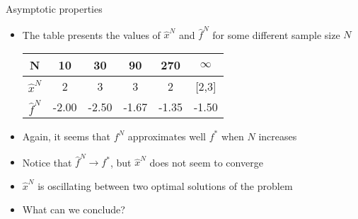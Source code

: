 \begin{frame}{Asymptotic properties}

\begin{itemize}

\item The table presents the values of $\hat x^N$ and $\hat f^N$ for some different sample size $N$


\begin{center}
\begin{tabular}{|c|c|c|c|c|c|}
\hline
N & 10 & 30 & 90 & 270 & $\infty$ \\
\hline
$\hat x^N$ & 2 & 3 & 3 & 2 & [2,3] \\
\hline
$\hat f^N$ & -2.00 & -2.50 & -1.67 & -1.35 & -1.50 \\
\hline
\end{tabular}
\end{center}

\item Again, it seems that  $f^N$ approximates well $f^*$ when $N$ increases
\pula

\item Notice that  $\hat f^N \to f^*$, but $\hat x^N$ does not seem to converge
\pula
\item $\hat x^N$ is oscillating between two optimal solutions of the problem
\pula

\item What can we conclude?
\end{itemize}

 \end{frame}

